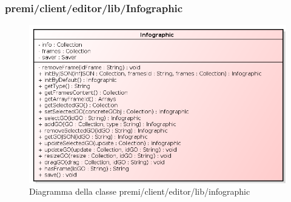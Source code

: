 \subsubsection{premi/client/editor/lib/Infographic}
\begin{figure}[h]
\begin{center}
\includegraphics[scale=0.40]{img/diacla/Infographic.png}
\caption{Diagramma della classe premi/client/editor/lib/infographic}
\end{center}
\end{figure}

